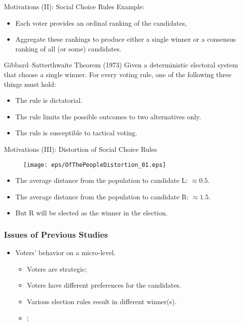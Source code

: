 \documentclass[xcolor=dvipsnames,envcountsect]{beamer}
\begin{document}
\begin{frame}{Motivations (II): Social Choice Rules}
\quad Example: 
\begin{itemize}
	\item Each voter provides an ordinal ranking of the candidates, 
	\item Aggregate these rankings to produce either a single winner or a consensus ranking of all (or some) candidates. 
\end{itemize}
\pause
	\begin{block}{Gibbard--Satterthwaite Theorem (1973)}
	Given a deterministic electoral system that choose a single winner. For every voting rule, one of the following three things must hold:
	\begin{itemize}
		\item The rule is dictatorial. 
		\item The rule limits the possible outcomes to two alternatives only. 
		\item The rule is susceptible to tactical voting. 
	\end{itemize}
	\end{block}
\end{frame}


\begin{frame}{Motivations (III): Distortion of Social Choice Rules}
\begin{figure}
	\begin{center}
		\texttt{[image: eps/OfThePeopleDistortion\_01.eps]}
	\end{center}
\end{figure}
\pause
\begin{itemize}
	\item The average distance from the population to candidate L: $\approx 0.5$.  
	\vspace{3pt}
	\item The average distance from the population to candidate R: $\approx 1.5$. 
	\vspace{3pt}
	\item But R will be elected as the winner in the election. 
\end{itemize}    
\end{frame}


\begin{frame}
\frametitle{Issues of Previous Studies}
\begin{itemize}
    \item Voters' behavior on a \textcolor{OliveGreen}{micro-level}. 
    \begin{itemize}
        \item Voters are strategic; 
        \item Voters have different preferences for the candidates.
        \item Various election rules result in different winner(s).
        \pause
        \item [] $\vdots$
    \end{itemize}
\end{itemize}
\end{frame}
\end{document}
